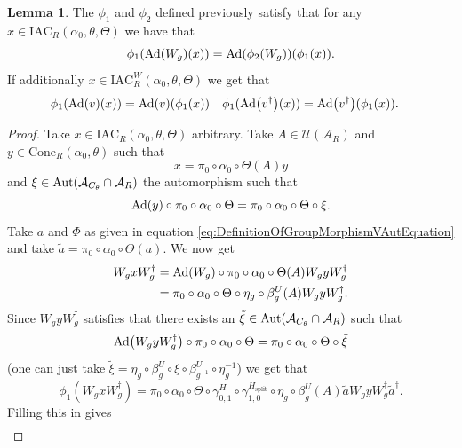 \documentclass[12pt,a4paper,twoside]{article}
\newcommand{\IAC}{\textrm{IAC}}
\let\originalleft\left
\let\originalright\right
\renewcommand{\left}{\mathopen{}\mathclose\bgroup\originalleft}
\renewcommand{\right}{\aftergroup\egroup\originalright}
\newcommand{\UU}{\mathcal U}
\renewcommand{\AA}{\mathcal A}
\newcommand{\Ad}[1]{\textrm{Ad}\left(#1\right)}
\newcommand{\Aut}[1]{\textrm{Aut}\left(#1\right)}
\theoremstyle{definition}
\newtheorem{lemma}[theorem]{Lemma}
\numberwithin{equation}{section}
\begin{document}
\begin{lemma}\label{lem:phi1phi2matchingCondition}
	The $\phi_1$ and $\phi_2$ defined previously satisfy that for any $x\in\IAC_R(\alpha_0,\theta,\Theta)$ we have that
	\begin{equation}
		\phi_1(\Ad{W_g}(x))=\Ad{\phi_2(W_g)}(\phi_1(x)).
	\end{equation}
	If additionally $x\in\IAC_R^W(\alpha_0,\theta,\Theta)$ we get that
	\begin{align}
		\phi_1(\Ad{v}(x))&=\Ad{v}(\phi_1(x))&\phi_1(\Ad{v^\dagger}(x))&=\Ad{v^\dagger}(\phi_1(x)).
	\end{align}
\end{lemma}
\begin{proof}
	Take $x\in \IAC_R(\alpha_0,\theta,\Theta)$ arbitrary. Take $A\in\UU(\AA_R)$ and $y\in\text{Cone}_R(\alpha_0,\theta)$ such that
	\begin{equation}
		x=\pi_0\circ\alpha_0\circ\Theta(A)y
	\end{equation}
	and $\xi\in\Aut{\AA_{C_\theta}\cap \AA_R}$ the automorphism such that
	\begin{equation}
		\Ad{y}\circ\pi_0\circ\alpha_0\circ\Theta=\pi_0\circ\alpha_0\circ\Theta\circ\xi.
	\end{equation}
	Take $a$ and $\Phi$ as given in equation \eqref{eq:DefinitionOfGroupMorphismVAutEquation} and take $\tilde{a}=\pi_0\circ\alpha_0\circ\Theta(a)$. We now get
	\begin{align}
		W_g x W_g^\dagger&=\Ad{W_g}\circ\pi_0\circ\alpha_0\circ\Theta(A) W_gyW_g^\dagger\\
		&=\pi_0\circ\alpha_0\circ\Theta\circ\eta_g\circ\beta_g^U(A) W_gyW_g^\dagger.
	\end{align}
	Since $W_g yW_g^\dagger$ satisfies that there exists an $\tilde{\xi}\in\Aut{\AA_{C_\theta}\cap \AA_R}$ such that
	\begin{equation}
		\Ad{W_gyW_g^\dagger}\circ \pi_0\circ\alpha_0\circ\Theta=\pi_0\circ\alpha_0\circ\Theta\circ\tilde\xi
	\end{equation}
	(one can just take $\tilde\xi=\eta_g\circ\beta_g^U\circ\xi\circ\beta_{g^{-1}}^U\circ\eta_g^{-1}$) we get that
	\begin{equation}\label{eq:lem:phi1phi2matchingCondition:Proof_W_g_Part}
		\phi_1(W_gxW_g^{\dagger})=\pi_0\circ\alpha_0\circ\Theta\circ\gamma^{H}_{0;1}\circ\gamma^{H_\text{split}}_{1;0}\circ\eta_g\circ\beta_g^U(A)\tilde{a}W_gyW_g^\dagger\tilde{a}^\dagger.
	\end{equation}
	Filling this in gives
	\begin{align}

\end{align}
\end{proof}
\end{document}
